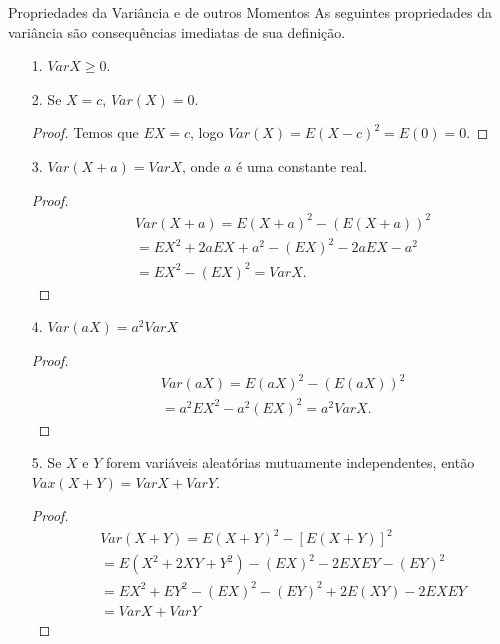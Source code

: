 %
\begin{frame}{Propriedades da Variância e de outros Momentos}
%
As seguintes propriedades da variância são consequências imediatas
de sua definição.
%
\begin{itemize}
\item[1.] $Var X\geq 0$.

\item[2.] Se $X=c$, $Var(X)=0$. \begin{proof} Temos que $EX=c$, logo $Var(X)=E(X-c)^2=E(0)=0$. \end{proof}

\item[3.] $Var(X+a)=Var X$, onde $a$ é uma constante real.

\begin{proof}
\begin{eqnarray}
& & Var(X+a)=E(X+a)^2-(E(X+a))^2\nonumber\\
& &=EX^2+2aEX+a^2-(EX)^2-2aEX-a^2
\nonumber\\
& &  =EX^2-(EX)^2=Var X.\nonumber
\end{eqnarray}
\end{proof}
\end{itemize}
\end{frame}
%
\begin{frame}
%
%
\begin{itemize}
\item[4.] $Var(aX)=a^2Var X$
\begin{proof}
\begin{eqnarray}
& & Var(aX)=E(aX)^2-(E(aX))^2\nonumber\\
& & =a^2EX^2-a^2(EX)^2=a^2Var X. \nonumber
\end{eqnarray}
\end{proof}
%
\item[5.] Se $X$ e $Y$ forem variáveis aleatórias mutuamente independentes, então $Vax(X+Y)=Var X+Var Y$.
\begin{proof}\begin{eqnarray}
& & Var(X+Y)=E(X+Y)^2-[E(X+Y)]^2 \nonumber\\
& & =E(X^2+2XY+Y^2)-(EX)^2-2EXEY-(EY)^2\nonumber\\
& & =EX^2+EY^2-(EX)^2-(EY)^2+2E(XY)-2EXEY\nonumber\\
& & =Var X+VarY\nonumber
\end{eqnarray}
\end{proof}
%
\end{itemize}
%
\end{frame}
